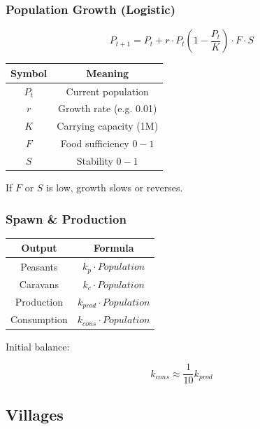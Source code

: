 \documentclass[a4paper,12pt]{article}
\begin{document}
\subsubsection{Population Growth (Logistic)}

\begin{equation}
P_{t+1} = P_t + r \cdot P_t 
\left(1 - \frac{P_t}{K}\right) \cdot F \cdot S
\end{equation}

\begin{table}[H]
\centering
\begin{tabular}{|c|c|}
\hline
Symbol & Meaning \\
\hline
$P_t$ & Current population \\
$r$ & Growth rate (e.g. 0.01) \\
$K$ & Carrying capacity (1M) \\
$F$ & Food sufficiency $0-1$ \\
$S$ & Stability $0-1$ \\
\hline
\end{tabular}
\end{table}

If $F$ or $S$ is low, growth slows or reverses.



\subsubsection{Spawn \& Production}

\begin{table}[H]
\centering
\begin{tabular}{|c|c|}
\hline
Output & Formula \\
\hline
Peasants & $k_p \cdot Population$ \\
Caravans & $k_c \cdot Population$ \\
Production & $k_{prod} \cdot Population$ \\
Consumption & $k_{cons} \cdot Population$ \\
\hline
\end{tabular}
\end{table}

Initial balance:

\begin{equation}
k_{cons} \approx \frac{1}{10} k_{prod}
\end{equation}



\subsection{Villages}
\end{document}
